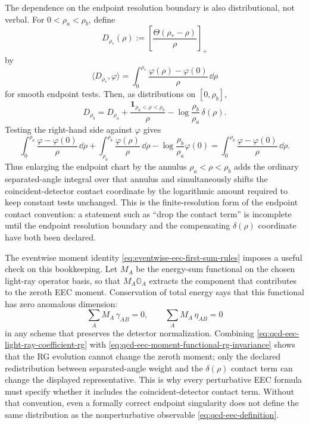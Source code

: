The dependence on the endpoint resolution boundary is also distributional,
not verbal.  For \(0<\rho_a<\rho_b\), define
\[
  D_{\rho_*}(\rho)
  :=
  \left[\frac{\Theta(\rho_*-\rho)}{\rho}\right]_{+}
\]
by
\[
  \langle D_{\rho_*},\varphi\rangle
  =
  \int_0^{\rho_*}
  \frac{\varphi(\rho)-\varphi(0)}{\rho}\,\dd\rho
\]
for smooth endpoint tests.  Then, as distributions on \([0,\rho_b]\),
\begin{equation}
  D_{\rho_b}
  =
  D_{\rho_a}
  +
  \frac{\mathbf 1_{\rho_a<\rho<\rho_b}}{\rho}
  -
  \log\frac{\rho_b}{\rho_a}\,\delta(\rho).
  \label{eq:qcd-eec-plus-resolution-shift}
\end{equation}
Testing the right-hand side against \(\varphi\) gives
\[
  \int_0^{\rho_a}\frac{\varphi-\varphi(0)}{\rho}\,\dd\rho
  +
  \int_{\rho_a}^{\rho_b}\frac{\varphi(\rho)}{\rho}\,\dd\rho
  -
  \log\frac{\rho_b}{\rho_a}\varphi(0)
  =
  \int_0^{\rho_b}\frac{\varphi-\varphi(0)}{\rho}\,\dd\rho .
\]
Thus enlarging the endpoint chart by the annulus
\(\rho_a<\rho<\rho_b\) adds the ordinary separated-angle integral over that
annulus and simultaneously shifts the coincident-detector contact coordinate
by the logarithmic amount required to keep constant tests unchanged.  This is
the finite-resolution form of the endpoint contact convention: a statement
such as ``drop the contact term'' is incomplete until the endpoint resolution
boundary and the compensating \(\delta(\rho)\) coordinate have both been
declared.

The eventwise moment identity
\eqref{eq:eventwise-eec-first-sum-rules} imposes a useful check on this
bookkeeping.  Let \(M_A\) be the energy-sum functional on the chosen
light-ray operator basis, so that \(M_A\mathbb O_A\) extracts the component
that contributes to the zeroth EEC moment.  Conservation of total energy says
that this functional has zero anomalous dimension:
\begin{equation}
  \sum_A M_A\,\gamma_{AB}=0,
  \qquad
  \sum_A M_A\,\eta_{AB}=0
  \label{eq:qcd-eec-moment-functional-rg-invariance}
\end{equation}
in any scheme that preserves the detector normalization.  Combining
\eqref{eq:qcd-eec-light-ray-coefficient-rg} with
\eqref{eq:qcd-eec-moment-functional-rg-invariance} shows that the RG
evolution cannot change the zeroth moment; only the declared redistribution
between separated-angle weight and the \(\delta(\rho)\) contact term can
change the displayed representative.  This is why every perturbative EEC
formula must specify whether it includes the coincident-detector contact
term.  Without that convention, even a formally correct endpoint singularity
does not define the same distribution as the nonperturbative observable
\eqref{eq:qcd-eec-definition}.

